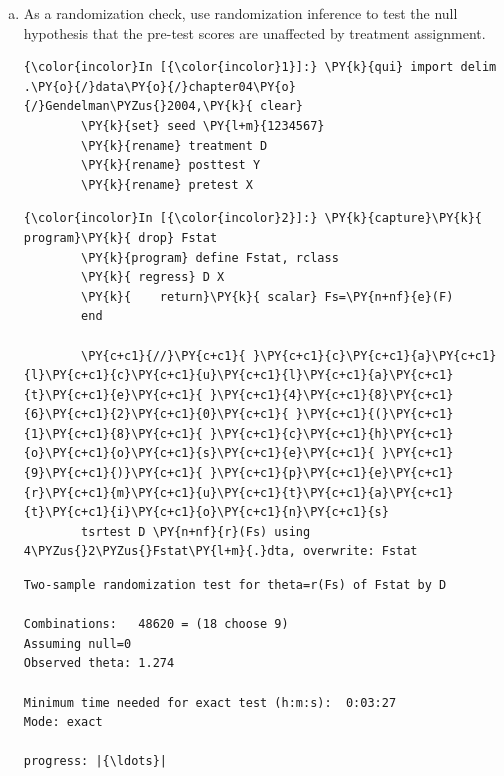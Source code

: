 \documentclass[11pt,notitlepage]{article}\usepackage[]{graphicx}\usepackage[]{color}
\makeatletter
\newenvironment{kframe}{%
 \def\at@end@of@kframe{}%
 \ifinner\ifhmode%
  \def\at@end@of@kframe{\end{minipage}}%
  \begin{minipage}{\columnwidth}%
 \fi\fi%
 \def\FrameCommand##1{\hskip\@totalleftmargin \hskip-\fboxsep
 \colorbox{shadecolor}{##1}\hskip-\fboxsep
     \hskip-\linewidth \hskip-\@totalleftmargin \hskip\columnwidth}%
 \MakeFramed {\advance\hsize-\width
   \@totalleftmargin\z@ \linewidth\hsize
   \@setminipage}}%
 {\par\unskip\endMakeFramed%
 \at@end@of@kframe}
\newenvironment{knitrout}{}{} %
\makeatother
\begin{document}
\begin{enumerate}[a)]
\item As a randomization check, use randomization inference to test the null hypothesis that the pre-test scores are unaffected by treatment assignment.

\begin{knitrout}
\color{fgcolor}\begin{kframe}
    \begin{Verbatim}[commandchars=\\\{\}]
{\color{incolor}In [{\color{incolor}1}]:} \PY{k}{qui} import delim .\PY{o}{/}data\PY{o}{/}chapter04\PY{o}{/}Gendelman\PYZus{}2004,\PY{k}{ clear}
        \PY{k}{set} seed \PY{l+m}{1234567}
        \PY{k}{rename} treatment D
        \PY{k}{rename} posttest Y
        \PY{k}{rename} pretest X
\end{Verbatim}

    \begin{Verbatim}[commandchars=\\\{\}]
{\color{incolor}In [{\color{incolor}2}]:} \PY{k}{capture}\PY{k}{ program}\PY{k}{ drop} Fstat
        \PY{k}{program} define Fstat, rclass
        \PY{k}{	regress} D X
        \PY{k}{    return}\PY{k}{ scalar} Fs=\PY{n+nf}{e}(F)
        end
        
        \PY{c+c1}{//}\PY{c+c1}{ }\PY{c+c1}{c}\PY{c+c1}{a}\PY{c+c1}{l}\PY{c+c1}{c}\PY{c+c1}{u}\PY{c+c1}{l}\PY{c+c1}{a}\PY{c+c1}{t}\PY{c+c1}{e}\PY{c+c1}{ }\PY{c+c1}{4}\PY{c+c1}{8}\PY{c+c1}{6}\PY{c+c1}{2}\PY{c+c1}{0}\PY{c+c1}{ }\PY{c+c1}{(}\PY{c+c1}{1}\PY{c+c1}{8}\PY{c+c1}{ }\PY{c+c1}{c}\PY{c+c1}{h}\PY{c+c1}{o}\PY{c+c1}{o}\PY{c+c1}{s}\PY{c+c1}{e}\PY{c+c1}{ }\PY{c+c1}{9}\PY{c+c1}{)}\PY{c+c1}{ }\PY{c+c1}{p}\PY{c+c1}{e}\PY{c+c1}{r}\PY{c+c1}{m}\PY{c+c1}{u}\PY{c+c1}{t}\PY{c+c1}{a}\PY{c+c1}{t}\PY{c+c1}{i}\PY{c+c1}{o}\PY{c+c1}{n}\PY{c+c1}{s}
        tsrtest D \PY{n+nf}{r}(Fs) using 4\PYZus{}2\PYZus{}Fstat\PY{l+m}{.}dta, overwrite: Fstat
\end{Verbatim}

    \begin{Verbatim}[commandchars=\\\{\}]
Two-sample randomization test for theta=r(Fs) of Fstat by D

Combinations:   48620 = (18 choose 9)
Assuming null=0
Observed theta: 1.274

Minimum time needed for exact test (h:m:s):  0:03:27
Mode: exact

progress: |{\ldots}|


\end{Verbatim}
\end{kframe}
\end{knitrout}
\end{enumerate}
\end{document}
